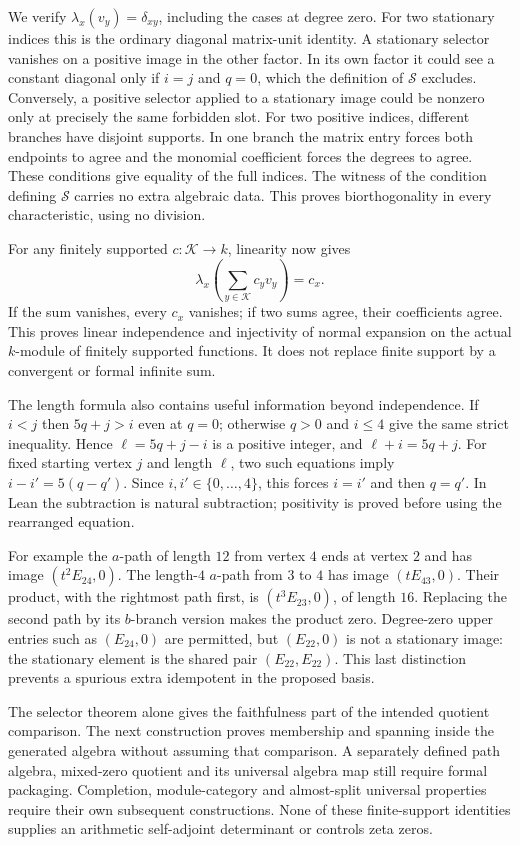 We verify $\lambda_x(v_y)=\delta_{xy}$, including the cases at degree
zero. For two stationary indices this is the ordinary diagonal matrix-unit
identity. A stationary selector vanishes on a positive image in the other
factor. In its own factor it could see a constant diagonal only if
$i=j$ and $q=0$, which the definition of $\mathcal S$ excludes. Conversely,
a positive selector applied to a stationary image could be nonzero only
at precisely the same forbidden slot. For two positive indices, different
branches have disjoint supports. In one branch the matrix entry forces
both endpoints to agree and the monomial coefficient forces the degrees
to agree. These conditions give equality of the full indices. The witness
of the condition defining $\mathcal S$ carries no extra algebraic data.
This proves biorthogonality in every characteristic, using no division.

For any finitely supported $c:\mathcal K\to k$, linearity now gives
\[
 \lambda_x\left(\sum_{y\in\mathcal K}c_yv_y\right)=c_x.
\]
If the sum vanishes, every $c_x$ vanishes; if two sums agree, their
coefficients agree. This proves linear independence and injectivity of
normal expansion on the actual $k$-module of finitely supported functions.
It does not replace finite support by a convergent or formal infinite sum.

The length formula also contains useful information beyond independence.
If $i<j$ then $5q+j>i$ even at $q=0$; otherwise $q>0$ and $i\leq4$ give
the same strict inequality. Hence $\ell=5q+j-i$ is a positive integer,
and $\ell+i=5q+j$. For fixed starting vertex $j$ and length $\ell$,
two such equations imply $i-i'=5(q-q')$. Since $i,i'\in\{0,\ldots,4\}$,
this forces $i=i'$ and then $q=q'$. In Lean the subtraction is natural
subtraction; positivity is proved before using the rearranged equation.

For example the $a$-path of length $12$ from vertex $4$ ends at vertex
$2$ and has image $(t^2E_{24},0)$. The length-$4$ $a$-path from $3$ to
$4$ has image $(tE_{43},0)$. Their product, with the rightmost path first,
is $(t^3E_{23},0)$, of length $16$. Replacing the second path by its
$b$-branch version makes the product zero. Degree-zero upper entries such
as $(E_{24},0)$ are permitted, but $(E_{22},0)$ is not a stationary image:
the stationary element is the shared pair $(E_{22},E_{22})$. This last
distinction prevents a spurious extra idempotent in the proposed basis.

The selector theorem alone gives the faithfulness part of the intended
quotient comparison. The next construction proves membership and spanning
inside the generated algebra without assuming that comparison. A separately
defined path algebra, mixed-zero quotient and its universal algebra map
still require formal packaging. Completion, module-category and almost-split
universal properties require their own subsequent constructions. None of
these finite-support identities supplies an arithmetic self-adjoint
determinant or controls zeta zeros.

